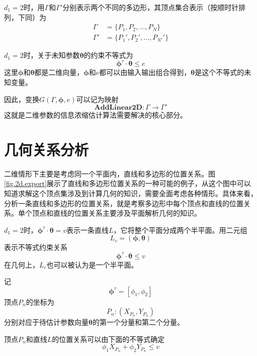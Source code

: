 $d_{1}=2$时，用$\Gamma$和$\Gamma'$分别表示两个不同的多边形，其顶点集合表示（按顺时针排列，下同）为
\begin{equation*}%
\begin{split}%
\Gamma&=\{P_{1},P_{2},\ldots,P_{N}\}\\
\Gamma'&=\{P_{1}',P_{2}',\ldots,P_{N'}'\}
\end{split}
\end{equation*}

$d_{1}=2$时，关于未知参数$\bm{\theta}$的约束不等式为
\begin{equation}\label{eq.3.L}
\bm{\phi}^{\tau}\cdot\bm{\theta}\leq e
\end{equation}
这里$\bm{\phi}$和$\bm{\theta}$都是二维向量，$\bm{\phi}$和$e$都可以由输入输出组合得到，$\bm{\theta}$是这个不等式的未知变量。

因此，变换$G(\Gamma,\bm{\phi},e)$可以记为映射
\begin{equation}%
\mathbf{AddLinear2D}\colon \Gamma\rightarrow\Gamma'
\end{equation}
这就是二维参数的信息浓缩估计算法需要解决的核心部分。

\section{几何关系分析}\label{sect:3.2}
二维情形下主要是考虑同一个平面内，直线和多边形的位置关系。图\ref{fig.2d.export}展示了直线和多边形位置关系的一种可能的例子，从这个图中可以知道求解这个顶点集涉及到计算几何的知识，需要全面考虑各种情形。具体来看，分析一条直线和多边形的位置关系，就是考察多边形中每个顶点和直线的位置关系。单个顶点和直线的位置关系主要涉及平面解析几何的知识。

$d_{1}=2$时，$\bm{\phi}^{\tau}\cdot\bm{\theta}=v$表示一条直线$L$，它将整个平面分成两个半平面。用二元组
$$L_{c}=(\bm{\phi},\bm{\theta})$$
表示不等式约束关系
\begin{equation}\label{eq.3.neq}
\bm{\phi}^{\tau}\cdot\bm{\theta}\leq v
\end{equation}
在几何上，$L_{c}$也可以被认为是一个半平面。

记
$$\bm{\phi}^{\tau}=[\phi_{1},\phi_{2}]$$
顶点$P_{n}$的坐标为
$$P_{n}\colon (X_{P_{n}},Y_{P_{n}})$$
分别对应于待估计参数向量$\bm{\theta}$的第一个分量和第二个分量。

顶点$P_{n}$和直线$L$的位置关系可以由下面的不等式确定
\begin{equation}\label{eq.3.L.P}
\phi_{1}X_{P_{n}}+\phi_{2}Y_{P_{n}}\leq v
\end{equation}


